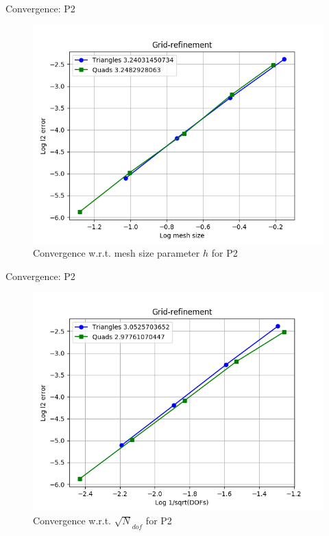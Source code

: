 \documentclass[11pt]{beamer}
\begin{document}
\begin{frame}{Convergence: P2}
\begin{figure}
	\centering
	\includegraphics[scale=0.5]{linadv-taylor-p2}
	\caption{Convergence w.r.t. mesh size parameter $h$ for P2}
\end{figure}
\end{frame}
\begin{frame}{Convergence: P2}
\begin{figure}
	\centering
	\includegraphics[scale=0.5]{linadv-taylor-p2-dofs}
	\caption{Convergence w.r.t. $\sqrt N_{dof}$ for P2}
\end{figure}
\end{frame}
\end{document}
